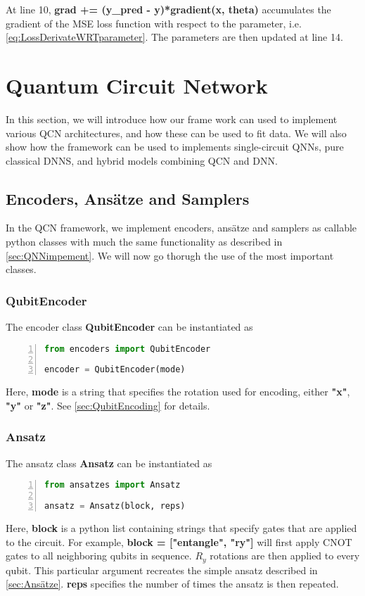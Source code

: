 At line 10, \textbf{grad += (y\_pred - y)*gradient(x, theta)} accumulates the gradient of the MSE loss function with respect to the parameter, i.e. \autoref{eq:LossDerivateWRTparameter}. The parameters are then updated at line 14.


\section{Quantum Circuit Network}\label{sec:QCNimplementation}
In this section, we will introduce how our frame work can used to implement various QCN architectures, and how these can be used to fit data. We will also show how the framework can be used to implements single-circuit QNNs, pure classical DNNS, and hybrid models combining QCN and DNN. 

\subsection{Encoders, Ansätze and Samplers}\label{sec:EAaS}
In the QCN framework, we implement encoders, ansätze and samplers as callable python classes with much the same functionality as described in \autoref{sec:QNNimpement}. We will now go thorugh the use of the most important classes.

\subsubsection*{QubitEncoder}
The encoder class \textbf{QubitEncoder} can be instantiated as 

\begin{lstlisting}[language=python, numbers=left]
from encoders import QubitEncoder

encoder = QubitEncoder(mode)
\end{lstlisting}

Here, \textbf{mode} is a string that specifies the rotation used for encoding, either \textbf{"x"}, \textbf{"y"} or \textbf{"z"}. See \autoref{sec:QubitEncoding} for details.

\subsubsection*{Ansatz}
The ansatz class \textbf{Ansatz} can be instantiated as
\begin{lstlisting}[language=python, numbers=left]
from ansatzes import Ansatz

ansatz = Ansatz(block, reps)
\end{lstlisting}
Here, \textbf{block} is a python list containing strings that specify gates that are applied to the circuit. For example, 
\textbf{block = ["entangle", "ry"]} will first apply CNOT gates to all neighboring qubits in sequence. $R_y$ rotations are then applied to every qubit. This particular argument recreates the simple ansatz described in \autoref{sec:Ansätze}. \textbf{reps} specifies the number of times the ansatz is then repeated.

